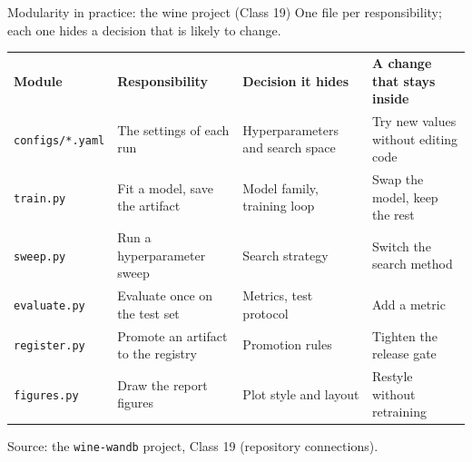 \begin{cframe}{Modularity in practice: the wine project (Class 19)}{}
\centering
{\small One file per responsibility; each one hides a decision that is likely to change.}

\vspace{0.5em}
\renewcommand{\arraystretch}{1.35}
\setlength{\tabcolsep}{5pt}
{\scriptsize
\begin{tabularx}{\textwidth}{>{\raggedright\arraybackslash}p{2.3cm} >{\raggedright\arraybackslash}X >{\raggedright\arraybackslash}p{3.3cm} >{\raggedright\arraybackslash}p{4.0cm}}
\rowcolor{courseblue}
\color{white}\textbf{Module} & \color{white}\textbf{Responsibility} & \color{white}\textbf{Decision it hides} & \color{white}\textbf{A change that stays inside} \\
\texttt{configs/*.yaml} & The settings of each run & Hyperparameters and search space & Try new values without editing code \\
\rowcolor{courseice}
\texttt{train.py} & Fit a model, save the artifact & Model family, training loop & Swap the model, keep the rest \\
\texttt{sweep.py} & Run a hyperparameter sweep & Search strategy & Switch the search method \\
\rowcolor{courseice}
\texttt{evaluate.py} & Evaluate once on the test set & Metrics, test protocol & Add a metric \\
\texttt{register.py} & Promote an artifact to the registry & Promotion rules & Tighten the release gate \\
\rowcolor{courseice}
\texttt{figures.py} & Draw the report figures & Plot style and layout & Restyle without retraining \\
\end{tabularx}}

\vspace{0.4em}
{\scriptsize\color{coursegray} Source: the \texttt{wine-wandb} project, Class 19 (repository connections).}
\coursefooter
\end{cframe}

